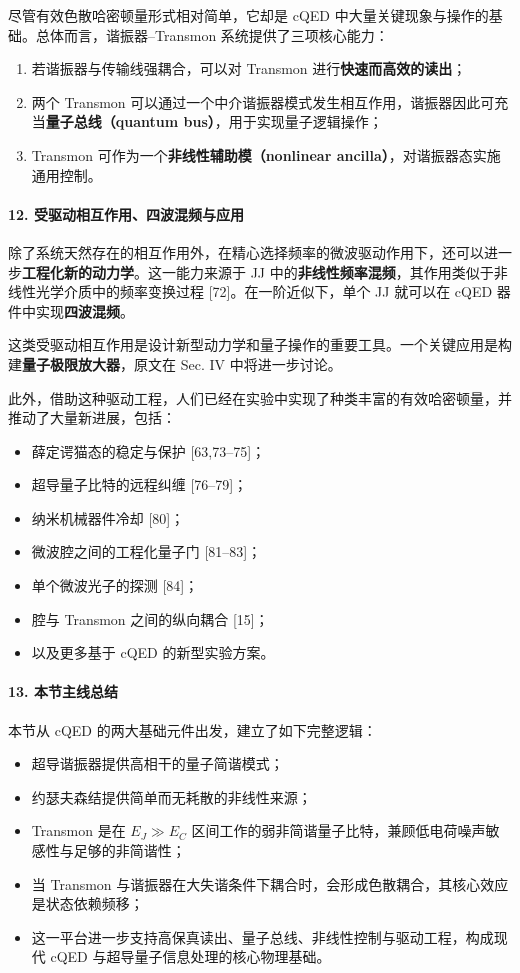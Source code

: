 \documentclass[12pt,a4paper,oneside]{ctexbook}
\begin{document}
尽管有效色散哈密顿量形式相对简单，它却是 cQED 中大量关键现象与操作的基础。总体而言，谐振器--Transmon 系统提供了三项核心能力：
\begin{enumerate}[leftmargin=2em]
    \item 若谐振器与传输线强耦合，可以对 Transmon 进行\textbf{快速而高效的读出}；
    \item 两个 Transmon 可以通过一个中介谐振器模式发生相互作用，谐振器因此可充当\textbf{量子总线（quantum bus）}，用于实现量子逻辑操作；
    \item Transmon 可作为一个\textbf{非线性辅助模（nonlinear ancilla）}，对谐振器态实施通用控制。
\end{enumerate}

\paragraph{12. 受驱动相互作用、四波混频与应用}

除了系统天然存在的相互作用外，在精心选择频率的微波驱动作用下，还可以进一步\textbf{工程化新的动力学}。这一能力来源于 JJ 中的\textbf{非线性频率混频}，其作用类似于非线性光学介质中的频率变换过程 [72]。在一阶近似下，单个 JJ 就可以在 cQED 器件中实现\textbf{四波混频}。

这类受驱动相互作用是设计新型动力学和量子操作的重要工具。一个关键应用是构建\textbf{量子极限放大器}，原文在 Sec. IV 中将进一步讨论。

此外，借助这种驱动工程，人们已经在实验中实现了种类丰富的有效哈密顿量，并推动了大量新进展，包括：
\begin{itemize}[leftmargin=2em]
    \item 薛定谔猫态的稳定与保护 [63,73--75]；
    \item 超导量子比特的远程纠缠 [76--79]；
    \item 纳米机械器件冷却 [80]；
    \item 微波腔之间的工程化量子门 [81--83]；
    \item 单个微波光子的探测 [84]；
    \item 腔与 Transmon 之间的纵向耦合 [15]；
    \item 以及更多基于 cQED 的新型实验方案。
\end{itemize}

\paragraph{13. 本节主线总结}

本节从 cQED 的两大基础元件出发，建立了如下完整逻辑：
\begin{itemize}[leftmargin=2em]
    \item 超导谐振器提供高相干的量子简谐模式；
    \item 约瑟夫森结提供简单而无耗散的非线性来源；
    \item Transmon 是在 \(E_J\gg E_C\) 区间工作的弱非简谐量子比特，兼顾低电荷噪声敏感性与足够的非简谐性；
    \item 当 Transmon 与谐振器在大失谐条件下耦合时，会形成色散耦合，其核心效应是状态依赖频移；
    \item 这一平台进一步支持高保真读出、量子总线、非线性控制与驱动工程，构成现代 cQED 与超导量子信息处理的核心物理基础。
\end{itemize}
\end{document}
